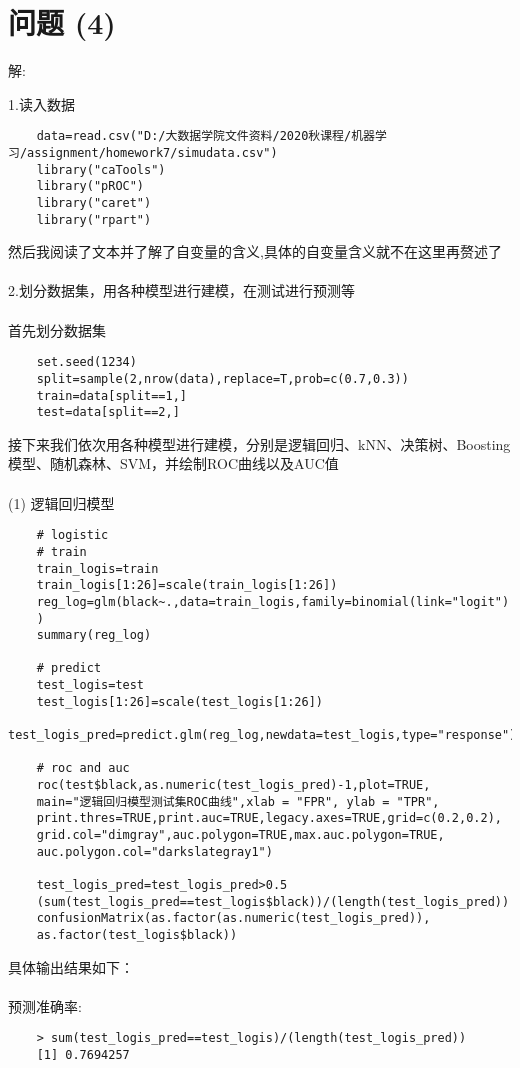 \documentclass[]{article}
\begin{document}
\section{问题 (4)}
\begin{flushleft}
	解:
\end{flushleft}
1.读入数据
\begin{lstlisting}
	data=read.csv("D:/大数据学院文件资料/2020秋课程/机器学习/assignment/homework7/simudata.csv")
	library("caTools")
	library("pROC")
	library("caret")
	library("rpart")
\end{lstlisting}
然后我阅读了文本并了解了自变量的含义,具体的自变量含义就不在这里再赘述了\\\\
2.划分数据集，用各种模型进行建模，在测试进行预测等\\\\
首先划分数据集
\begin{lstlisting}
	set.seed(1234)
	split=sample(2,nrow(data),replace=T,prob=c(0.7,0.3))
	train=data[split==1,]
	test=data[split==2,]
\end{lstlisting}
接下来我们依次用各种模型进行建模，分别是逻辑回归、kNN、决策树、Boosting 模型、随机森林、SVM，并绘制ROC曲线以及AUC值\\\\
(1) 逻辑回归模型
\begin{lstlisting}
	# logistic
	# train
	train_logis=train
	train_logis[1:26]=scale(train_logis[1:26])
	reg_log=glm(black~.,data=train_logis,family=binomial(link="logit")
	)
	summary(reg_log)
	
	# predict
	test_logis=test
	test_logis[1:26]=scale(test_logis[1:26])
	test_logis_pred=predict.glm(reg_log,newdata=test_logis,type="response")
	
	# roc and auc
	roc(test$black,as.numeric(test_logis_pred)-1,plot=TRUE,
	main="逻辑回归模型测试集ROC曲线",xlab = "FPR", ylab = "TPR",
	print.thres=TRUE,print.auc=TRUE,legacy.axes=TRUE,grid=c(0.2,0.2),
	grid.col="dimgray",auc.polygon=TRUE,max.auc.polygon=TRUE,
	auc.polygon.col="darkslategray1")
	
	test_logis_pred=test_logis_pred>0.5
	(sum(test_logis_pred==test_logis$black))/(length(test_logis_pred))
	confusionMatrix(as.factor(as.numeric(test_logis_pred)), 
	as.factor(test_logis$black))
\end{lstlisting}
具体输出结果如下：\\\\
预测准确率:
\begin{lstlisting}
	> sum(test_logis_pred==test_logis)/(length(test_logis_pred))
	[1] 0.7694257
\end{lstlisting}
\end{document}
